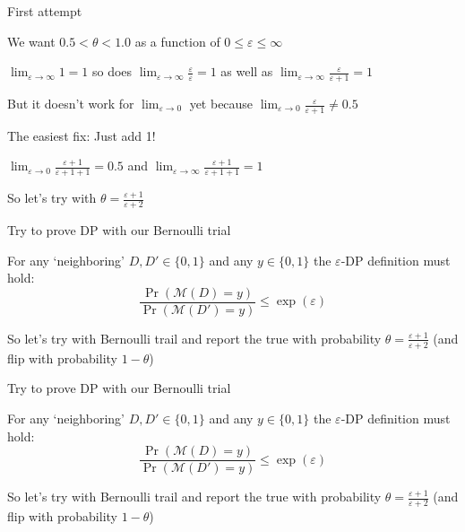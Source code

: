 \documentclass[12pt,aspectratio=169,handout]{beamer}
\begin{document}
\begin{frame}{First attempt}

We want $0.5 < \theta < 1.0$ as a function of $0 \leq \varepsilon \leq \infty$

$\lim_{\varepsilon \to \infty} 1 = 1$
so does
$\lim_{\varepsilon \to \infty} \frac{\varepsilon}{\varepsilon} = 1$
as well as
$\lim_{\varepsilon \to \infty} \frac{\varepsilon}{\varepsilon + 1} = 1$

But it doesn't work for $\lim_{\varepsilon \to 0}$ yet because $\lim_{\varepsilon \to 0} \frac{\varepsilon}{\varepsilon + 1} \neq 0.5$

The easiest fix: Just add 1!

$\lim_{\varepsilon \to 0} \frac{\varepsilon + 1}{\varepsilon + 1 + 1} = 0.5$ and $\lim_{\varepsilon \to \infty} \frac{\varepsilon + 1}{\varepsilon + 1 + 1} = 1$

So let's try with $\theta = \frac{\varepsilon + 1}{\varepsilon + 2}$


\end{frame}



\begin{frame}{Try to prove DP with our Bernoulli trial}

For any `neighboring' $D, D' \in \{0, 1\}$ and any $y \in \{0, 1\}$ the $\varepsilon$-DP definition must hold:
$$
\frac{
	\Pr(\mathcal{M}(D) = y)
}{
	\Pr(\mathcal{M}(D') = y)
} \leq \exp(\varepsilon)
$$


So let's try with Bernoulli trail and report the true with probability $\theta = \frac{\varepsilon + 1}{\varepsilon + 2}$ (and flip with probability  $1 - \theta$)

\end{frame}



\begin{frame}{Try to prove DP with our Bernoulli trial}

For any `neighboring' $D, D' \in \{0, 1\}$ and any $y \in \{0, 1\}$ the $\varepsilon$-DP definition must hold:
$$
\frac{
	\Pr(\mathcal{M}(D) = y)
}{
	\Pr(\mathcal{M}(D') = y)
} \leq \exp(\varepsilon)
$$


So let's try with Bernoulli trail and report the true with probability $\theta = \frac{\varepsilon + 1}{\varepsilon + 2}$ (and flip with probability  $1 - \theta$)

\end{frame}
\end{document}
